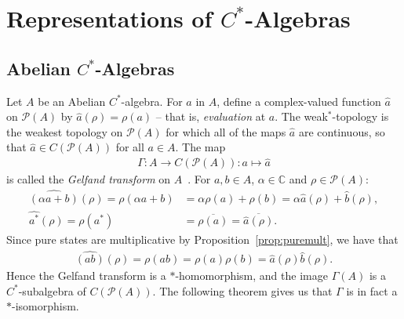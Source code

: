 \documentclass[11pt,a4paper]{report}
\theoremstyle{plain}
\theoremstyle{definition}
\newcommand{\1}{\mathbbm{1}}
\newcommand{\C}{\mathbb{C}}
\renewcommand{\P}[1]{\mathscr{P}(#1)}
\begin{document}
\chapter{Representations of $C^\ast$-Algebras}
\section{Abelian $C^\ast$-Algebras}\label{section:abelian}


Let $A$ be an Abelian $C^\ast$-algebra. For $a$ in $A$, define a complex-valued 
function $\hat{a}$ on $\P{A}$ by $\hat{a}(\rho)= \rho(a)$ -- that is, 
\emph{evaluation} at $a$. The weak$^\ast$-topology is the weakest topology on 
$\P{A}$ for which all of the maps $\hat{a}$ are continuous, so that $\hat{a} \in 
C(\P{A})$ for all $a\in A$. The map
\begin{align*}
	\Gamma:A \to C(\P{A}) : a\mapsto \hat{a}
\end{align*}
is called the \emph{Gelfand transform} on $A$~\cite{davidson96}.
For $a,b \in A$, $\alpha\in\C$ and $\rho\in\P{A}$:
\begin{align*}
		\widehat{(\alpha a+ b)}(\rho) = \rho(\alpha a+ b) 
	&=	\alpha\rho(a) +\rho(b) = \alpha\hat{a}(\rho)+\hat{b}(\rho), 					\\
		\widehat{a^\ast}(\rho) = \rho(a^\ast) 
	&= \overline{\rho(a)} = \overline{\hat{a}(\rho)}.
\end{align*}
Since pure states are multiplicative by Proposition~\ref{prop:puremult}, we have that 
\begin{align*}
	\widehat{(ab)} (\rho)= \rho(ab) = \rho(a)\rho(b) = \hat{a}(\rho)\hat{b}(\rho).
\end{align*}
Hence the Gelfand transform is a $\ast$-homomorphism, and the image $\Gamma(A)$ 
is a $C^\ast$-subalgebra of $C(\P A)$. The following theorem gives us that 
$\Gamma$ is in fact a $\ast$-isomorphism.
\end{document}
